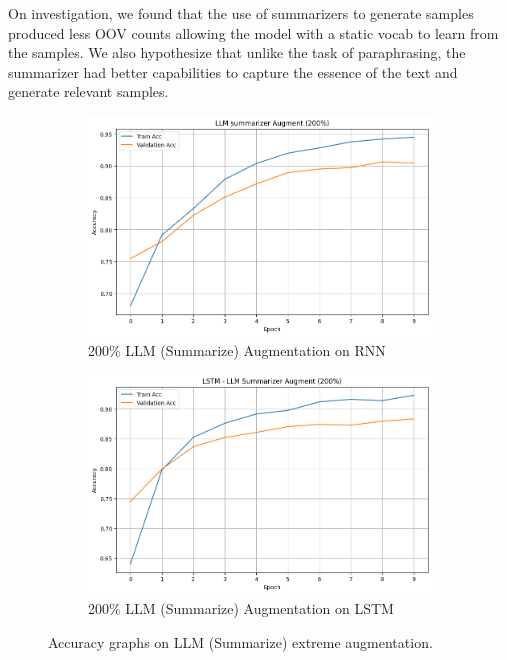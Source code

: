 \documentclass[10pt]{extarticle}
\begin{document}
On investigation, we found that the use of summarizers to generate samples
produced less OOV counts allowing the model with a static vocab to learn from
the samples. We also hypothesize that unlike the task of paraphrasing, the
summarizer had better capabilities to capture the essence of the text and
generate relevant samples.

\begin{figure}[ht]
  \centering
  \begin{subfigure}[b]{0.45\textwidth}
    \includegraphics[width=\textwidth]{img/llm_summarise_200_rnn.png}
    \caption{200\% LLM (Summarize) Augmentation on RNN}
    \label{fig:llm_summarise_200_rnn}
  \end{subfigure}
  \hfill
  \begin{subfigure}[b]{0.45\textwidth}
    \includegraphics[width=\textwidth]{img/llm_summarise_200_lstm.png}
    \caption{200\% LLM (Summarize) Augmentation on LSTM}
    \label{fig:llm_summarise_200_lstm}
  \end{subfigure}
  \caption{Accuracy graphs on LLM (Summarize) extreme augmentation.}
  \label{fig:llm_extreme_summerizer}
\end{figure}
\end{document}
